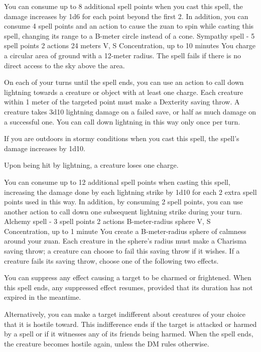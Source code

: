     You can consume up to 8 additional spell points when you cast this spell, the damage increases by 1d6 for each point beyond the first 2.
    In addition, you can consume 4 spell points and an action to cause the zuan to spin while casting this spell, changing its range to a B-meter circle instead of a cone.
    {Sympathy spell - 5 spell points}
    {2 actions}
    {24 meters}
    {V, S}
    {Concentration, up to 10 minutes}
    You charge a circular area of ground with a 12-meter radius.
    The spell fails if there is no direct access to the sky above the area.

    On each of your turns until the spell ends, you can use an action to call down lightning towards a creature or object with at least one charge.
    Each creature within 1 meter of the targeted point must make a Dexterity saving throw.
    A creature takes 3d10 lightning damage on a failed save, or half as much damage on a successful one.
    You can call down lightning in this way only once per turn.

    If you are outdoors in stormy conditions when you cast this spell, the spell's damage increases by 1d10.

    Upon being hit by lightning, a creature loses one charge.

    You can consume up to 12 additional spell points when casting this spell, increasing the damage done by each lightning strike by 1d10 for each 2 extra spell points used in this way.
    In addition, by consuming 2 spell points, you can use another action to call down one subsequent lightning strike during your turn.
    {Alchemy spell - 3 spell points}
    {2 actions}
    {B-meter-radius sphere}
    {V, S}
    {Concentration, up to 1 minute}
    You create a B-meter-radius sphere of calmness around your zuan.
    Each creature in the sphere's radius must make a Charisma saving throw; a creature can choose to fail this saving throw if it wishes.
    If a creature fails its saving throw, choose one of the following two effects.

    You can suppress any effect causing a target to be charmed or frightened.
    When this spell ends, any suppressed effect resumes, provided that its duration has not expired in the meantime.

    Alternatively, you can make a target indifferent about creatures of your choice that it is hostile toward.
    This indifference ends if the target is attacked or harmed by a spell or if it witnesses any of its friends being harmed.
    When the spell ends, the creature becomes hostile again, unless the DM rules otherwise.

